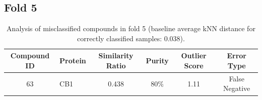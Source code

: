 \documentclass{article}
\newenvironment{smarttabular}[1]{%
    \begin{tabular}{#1}%
}{%
    \end{tabular}%
}
\begin{document}
\clearpage

\subsection{Fold 5}

\begin{table}[H]
    \centering
    \small
    \caption{Analysis of misclassified compounds in fold 5 (baseline average kNN distance for correctly classified samples: 0.038).}
    \label{tab:misclassified_compounds_5}
    \begin{smarttabular}{clcccc}
        \toprule
        \textbf{Compound ID} & \textbf{Protein} & \textbf{Similarity Ratio} & \textbf{Purity} & \textbf{Outlier Score} & \textbf{Error Type} \\
        \midrule
        63 & CB1 & 0.438 & 80\% & 1.11 & False Negative \\
        \bottomrule
    \end{smarttabular}
\end{table}

\clearpage
\end{document}
